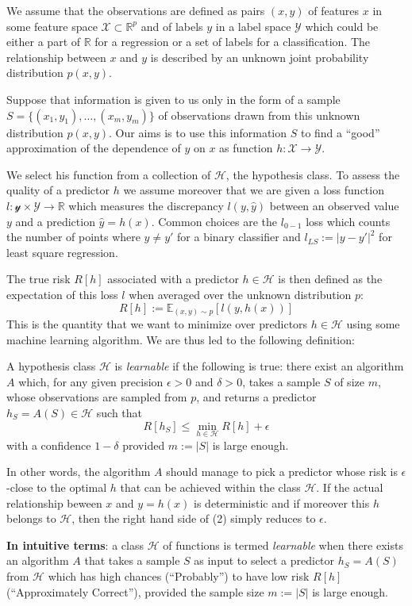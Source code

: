 \documentclass{tufte-handout}
\begin{document}
We assume that the observations are defined as pairs $(x,y)$ of features $x$ in some feature space $\mathcal{X} \subset \mathbb{R}^p$ and of labels $y$ in a label space $\mathcal{Y}$ which could be either a part of $\mathbb{R}$ for a regression or a set of labels for a classification.
The relationship between $x$ and $y$ is described by an unknown joint probability distribution $p(x,y)$. 

Suppose that information is given to us only in the form of a sample $S=\{(x_1,y_1), \ldots, (x_m,y_m)\}$ of observations drawn from this unknown distribution $p(x,y)$.
Our aims is to use this information $S$ to find a ``good'' approximation of the dependence of $y$ on $x$ as function $h: \mathcal{X} \to \mathcal{Y}$. 

We select his function from a collection of $\mathcal{H}$, the hypothesis class. To assess the quality of a predictor $h$ we assume moreover that we are given a loss function $l: \mathcal{y} \times \mathcal{Y} \to \mathbb{R}$ which measures the discrepancy $l(y, \hat{y})$ between an observed value $y$ and a prediction $\hat{y} = h(x)$.
Common choices are the $l_{0-1}$ loss which counts the number of points where $y \neq y'$ for a binary classifier and $l_{LS} := \left\lvert y-y'\right\rvert^2$ for least square regression.

The true risk $R[h]$ associated with a predictor $h \in \mathcal{H}$ is then defined as the expectation of this loss $l$ when averaged over the unknown distribution $p$:
\begin{equation}
  R[h] := \mathbb{E}_{(x,y) \sim p}[l(y, h(x))]
\end{equation}
This is the quantity that we want to minimize over predictors $h \in \mathcal{H}$ using some machine learning algorithm. We are thus led to the following definition:

A hypothesis class $\mathcal{H}$ is \textit{learnable} if the following is true: there exist an algorithm $A$ which, for any given precision $\epsilon > 0$ and $\delta >0$, takes a sample $S$ of size $m$, whose observations are sampled from $p$, and returns a predictor $h_S = A(S) \in \mathcal{H}$ such that 
\begin{equation}
  R[h_S] \leq \min_{h \in \mathcal{H}}R[h]+\epsilon
\end{equation}
with a confidence $1-\delta$ provided $m := \left\lvert S \right\rvert$ is large enough.

In other words, the algorithm $A$ should manage to pick a predictor whose risk is $\epsilon$-close to the optimal $h$ that can be achieved within the class $\mathcal{H}$.
If the actual relationship beween $x$ and $y=h(x)$ is deterministic and if moreover this $h$ belongs to $\mathcal{H}$, then the right hand side of (2) simply reduces to $\epsilon$.

\textbf{In intuitive terms}: a class $\mathcal{H}$ of functions is termed \textit{learnable} when there exists an algorithm $A$ that takes a sample $S$ as input to select a predictor $h_S = A(S)$ from $\mathcal{H}$ which has high chances (``Probably'') to have low risk $R[h]$ (``Approximately Correct''), provided the sample size $m:=\left\lvert S \right\rvert $ is large enough.
\end{document}
